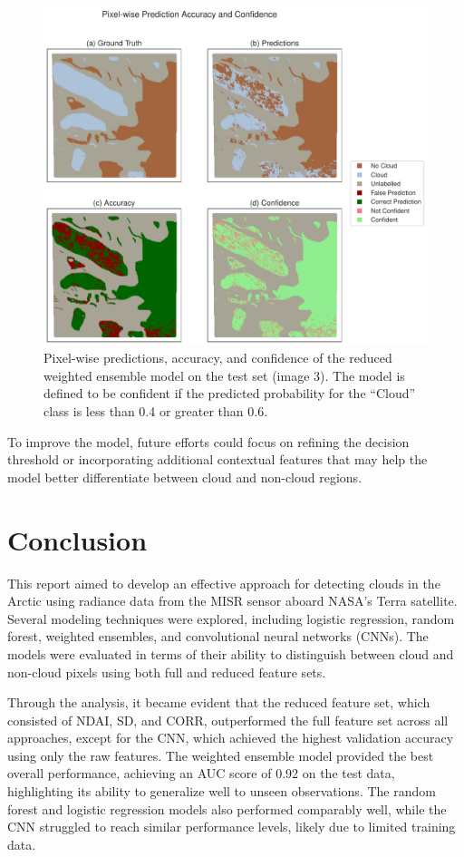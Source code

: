 \documentclass[11pt,letterpaper]{article}
\begin{document}
\begin{figure}[H]
    \centering
    \includegraphics[width=\linewidth]{figs/error_analysis.pdf}
    \caption{Pixel-wise predictions, accuracy, and confidence of the reduced weighted ensemble model on the test set (image 3). The model is defined to be confident if the predicted probability for the ``Cloud'' class is less than 0.4 or greater than 0.6.}
    \label{fig_error_analysis}
\end{figure}

To improve the model, future efforts could focus on refining the decision threshold or incorporating additional contextual features that may help the model better differentiate between cloud and non-cloud regions.

\section{Conclusion}
This report aimed to develop an effective approach for detecting clouds in the Arctic using radiance data from the MISR sensor aboard NASA's Terra satellite. Several modeling techniques were explored, including logistic regression, random forest, weighted ensembles, and convolutional neural networks (CNNs). The models were evaluated in terms of their ability to distinguish between cloud and non-cloud pixels using both full and reduced feature sets.

Through the analysis, it became evident that the reduced feature set, which consisted of NDAI, SD, and CORR, outperformed the full feature set across all approaches, except for the CNN, which achieved the highest validation accuracy using only the raw features. The weighted ensemble model provided the best overall performance, achieving an AUC score of 0.92 on the test data, highlighting its ability to generalize well to unseen observations. The random forest and logistic regression models also performed comparably well, while the CNN struggled to reach similar performance levels, likely due to limited training data.
\end{document}
